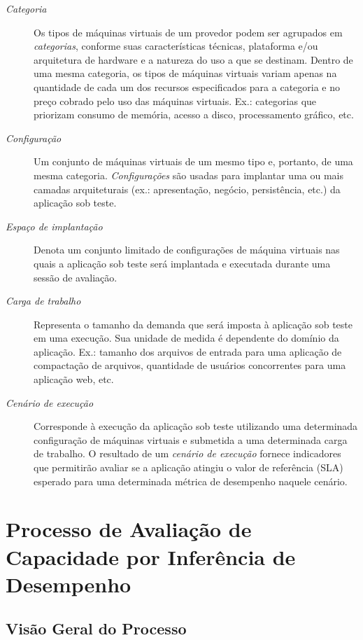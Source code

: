 \documentclass[12pt]{article}
\begin{document}
\begin{description}
\item[\em Categoria]
Os tipos de máquinas virtuais de um provedor podem ser agrupados em {\em categorias}, conforme suas características técnicas, plataforma e/ou arquitetura de hardware e a natureza do uso a que se destinam. Dentro de uma mesma categoria, os tipos de máquinas virtuais variam apenas na quantidade de cada um dos recursos especificados para a categoria e no preço cobrado pelo uso das máquinas virtuais. Ex.: categorias que priorizam consumo de memória, acesso a disco, processamento gráfico, etc. 

\item[\em Configuração]
Um conjunto de máquinas virtuais de um mesmo tipo e, portanto, de uma mesma categoria. {\em Configurações} são usadas para implantar uma ou mais camadas arquiteturais (ex.: apresentação, negócio, persistência, etc.) da aplicação sob teste.

\item[\em Espaço de implantação]
Denota um conjunto limitado de configurações de máquina virtuais nas quais a aplicação sob teste será implantada e executada durante uma sessão de avaliação. 

\item[\em Carga de trabalho]
Representa o tamanho da demanda que será imposta à aplicação sob teste em uma execução. Sua unidade de medida é dependente do domínio da aplicação. Ex.: tamanho dos arquivos de entrada para uma aplicação de compactação de arquivos, quantidade de usuários concorrentes para uma aplicação web, etc.

\item[\em Cenário de execução]
Corresponde à execução da aplicação sob teste utilizando uma determinada configuração de máquinas virtuais e submetida a uma determinada carga de trabalho. O resultado de um {\em cenário de execução} fornece indicadores que permitirão avaliar se a aplicação atingiu o valor de referência (SLA) esperado para uma determinada métrica de desempenho naquele cenário.

\end{description}

\section{Processo de Avaliação de Capacidade por Inferência de Desempenho}\label{sec:process}

\subsection{Visão Geral do Processo}
\end{document}
